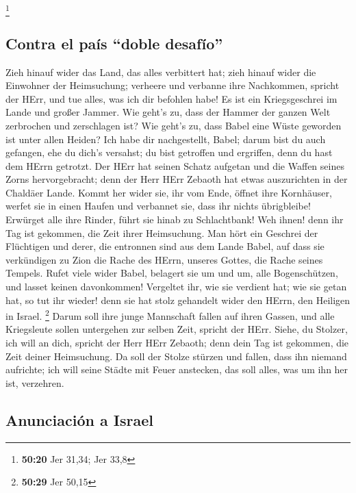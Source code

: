 \footnote{\textbf{50:20} Jer 31,34; Jer 33,8}

\hypertarget{contra-el-pauxeds-doble-desafuxedo}{%
\subsection{Contra el país ``doble
desafío''}\label{contra-el-pauxeds-doble-desafuxedo}}

 Zieh hinauf wider das Land, das alles verbittert hat;
zieh hinauf wider die Einwohner der Heimsuchung; verheere und verbanne
ihre Nachkommen, spricht der HErr, und tue alles, was ich dir befohlen
habe!  Es ist ein Kriegsgeschrei im Lande und großer
Jammer.  Wie geht's zu, dass der Hammer der ganzen Welt
zerbrochen und zerschlagen ist? Wie geht's zu, dass Babel eine Wüste
geworden ist unter allen Heiden?  Ich habe dir
nachgestellt, Babel; darum bist du auch gefangen, ehe du dich's
versahst; du bist getroffen und ergriffen, denn du hast dem HErrn
getrotzt.  Der HErr hat seinen Schatz aufgetan und die
Waffen seines Zorns hervorgebracht; denn der Herr HErr Zebaoth hat etwas
auszurichten in der Chaldäer Lande.  Kommt her wider sie,
ihr vom Ende, öffnet ihre Kornhäuser, werfet sie in einen Haufen und
verbannet sie, dass ihr nichts übrigbleibe!  Erwürget
alle ihre Rinder, führt sie hinab zu Schlachtbank! Weh ihnen! denn ihr
Tag ist gekommen, die Zeit ihrer Heimsuchung.  Man hört
ein Geschrei der Flüchtigen und derer, die entronnen sind aus dem Lande
Babel, auf dass sie verkündigen zu Zion die Rache des HErrn, unseres
Gottes, die Rache seines Tempels.  Rufet viele wider
Babel, belagert sie um und um, alle Bogenschützen, und lasset keinen
davonkommen! Vergeltet ihr, wie sie verdient hat; wie sie getan hat, so
tut ihr wieder! denn sie hat stolz gehandelt wider den HErrn, den
Heiligen in Israel. \footnote{\textbf{50:29} Jer 50,15} 
Darum soll ihre junge Mannschaft fallen auf ihren Gassen, und alle
Kriegsleute sollen untergehen zur selben Zeit, spricht der HErr.
 Siehe, du Stolzer, ich will an dich, spricht der Herr
HErr Zebaoth; denn dein Tag ist gekommen, die Zeit deiner Heimsuchung.
 Da soll der Stolze stürzen und fallen, dass ihn niemand
aufrichte; ich will seine Städte mit Feuer anstecken, das soll alles,
was um ihn her ist, verzehren.

\hypertarget{anunciaciuxf3n-a-israel}{%
\subsection{Anunciación a Israel}\label{anunciaciuxf3n-a-israel}}

